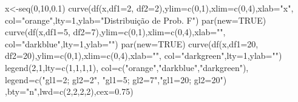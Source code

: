 \documentclass[
  letterpaper,
  DIV=11,
  numbers=noendperiod]{scrartcl}
\newenvironment{Shaded}{\begin{snugshade}}{\end{snugshade}}
\newcommand{\AttributeTok}[1]{\textcolor[rgb]{0.40,0.45,0.13}{#1}}
\newcommand{\ConstantTok}[1]{\textcolor[rgb]{0.56,0.35,0.01}{#1}}
\newcommand{\DecValTok}[1]{\textcolor[rgb]{0.68,0.00,0.00}{#1}}
\newcommand{\FloatTok}[1]{\textcolor[rgb]{0.68,0.00,0.00}{#1}}
\newcommand{\FunctionTok}[1]{\textcolor[rgb]{0.28,0.35,0.67}{#1}}
\newcommand{\NormalTok}[1]{\textcolor[rgb]{0.00,0.23,0.31}{#1}}
\newcommand{\OtherTok}[1]{\textcolor[rgb]{0.00,0.23,0.31}{#1}}
\newcommand{\StringTok}[1]{\textcolor[rgb]{0.13,0.47,0.30}{#1}}
\begin{document}
\begin{Shaded}
\begin{Highlighting}[]
\NormalTok{x}\OtherTok{\textless{}{-}}\FunctionTok{seq}\NormalTok{(}\DecValTok{0}\NormalTok{,}\DecValTok{10}\NormalTok{,}\FloatTok{0.1}\NormalTok{) }
\FunctionTok{curve}\NormalTok{(}\FunctionTok{df}\NormalTok{(x,}\AttributeTok{df1=}\DecValTok{2}\NormalTok{, }\AttributeTok{df2=}\DecValTok{2}\NormalTok{),}\AttributeTok{ylim=}\FunctionTok{c}\NormalTok{(}\DecValTok{0}\NormalTok{,}\DecValTok{1}\NormalTok{),}\AttributeTok{xlim=}\FunctionTok{c}\NormalTok{(}\DecValTok{0}\NormalTok{,}\DecValTok{4}\NormalTok{),}\AttributeTok{xlab=}\StringTok{"x"}\NormalTok{,}
      \AttributeTok{col=}\StringTok{"orange"}\NormalTok{,}\AttributeTok{lty=}\DecValTok{1}\NormalTok{,}\AttributeTok{ylab=}\StringTok{"Distribuição de Prob. F"}\NormalTok{)}
\FunctionTok{par}\NormalTok{(}\AttributeTok{new=}\ConstantTok{TRUE}\NormalTok{)}
\FunctionTok{curve}\NormalTok{(}\FunctionTok{df}\NormalTok{(x,}\AttributeTok{df1=}\DecValTok{5}\NormalTok{, }\AttributeTok{df2=}\DecValTok{7}\NormalTok{),}\AttributeTok{ylim=}\FunctionTok{c}\NormalTok{(}\DecValTok{0}\NormalTok{,}\DecValTok{1}\NormalTok{),}\AttributeTok{xlim=}\FunctionTok{c}\NormalTok{(}\DecValTok{0}\NormalTok{,}\DecValTok{4}\NormalTok{),}\AttributeTok{xlab=}\StringTok{""}\NormalTok{,}
      \AttributeTok{col=}\StringTok{"darkblue"}\NormalTok{,}\AttributeTok{lty=}\DecValTok{1}\NormalTok{,}\AttributeTok{ylab=}\StringTok{""}\NormalTok{)}
\FunctionTok{par}\NormalTok{(}\AttributeTok{new=}\ConstantTok{TRUE}\NormalTok{)}
\FunctionTok{curve}\NormalTok{(}\FunctionTok{df}\NormalTok{(x,}\AttributeTok{df1=}\DecValTok{20}\NormalTok{, }\AttributeTok{df2=}\DecValTok{20}\NormalTok{),}\AttributeTok{ylim=}\FunctionTok{c}\NormalTok{(}\DecValTok{0}\NormalTok{,}\DecValTok{1}\NormalTok{),}\AttributeTok{xlim=}\FunctionTok{c}\NormalTok{(}\DecValTok{0}\NormalTok{,}\DecValTok{4}\NormalTok{),}\AttributeTok{xlab=}\StringTok{""}\NormalTok{,}
      \AttributeTok{col=}\StringTok{"darkgreen"}\NormalTok{,}\AttributeTok{lty=}\DecValTok{1}\NormalTok{,}\AttributeTok{ylab=}\StringTok{""}\NormalTok{)}
\FunctionTok{legend}\NormalTok{(}\DecValTok{2}\NormalTok{,}\DecValTok{1}\NormalTok{,}\AttributeTok{lty=}\FunctionTok{c}\NormalTok{(}\DecValTok{1}\NormalTok{,}\DecValTok{1}\NormalTok{,}\DecValTok{1}\NormalTok{,}\DecValTok{1}\NormalTok{), }\AttributeTok{col=}\FunctionTok{c}\NormalTok{(}\StringTok{"orange"}\NormalTok{,}\StringTok{"darkblue"}\NormalTok{,}\StringTok{"darkgreen"}\NormalTok{),}
       \AttributeTok{legend=}\FunctionTok{c}\NormalTok{(}\StringTok{"gl1=2; gl2=2"}\NormalTok{, }\StringTok{"gl1=5; gl2=7"}\NormalTok{,}\StringTok{"gl1=20; gl2=20"}\NormalTok{)}
\NormalTok{       ,}\AttributeTok{bty=}\StringTok{"n"}\NormalTok{,}\AttributeTok{lwd=}\FunctionTok{c}\NormalTok{(}\DecValTok{2}\NormalTok{,}\DecValTok{2}\NormalTok{,}\DecValTok{2}\NormalTok{,}\DecValTok{2}\NormalTok{),}\AttributeTok{cex=}\FloatTok{0.75}\NormalTok{)}
\end{Highlighting}
\end{Shaded}
\end{document}
